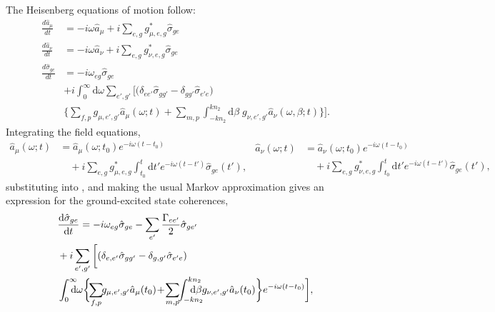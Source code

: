 \documentclass[aps,pra,twocolumn]{revtex4-1} %
\newcommand{\der}[1]{\frac{d {#1}}{dt}}
\begin{document}
The Heisenberg equations of motion follow:
	\begin{align}
		\der{\hat{a}_\mu} &= -i\omega \hat{a}_\mu +i\sum_{e,g} g_{\mu, e,g}^* \hat{\sigma}_{ge} \label{eq:da}\\
		\der{\hat{a}_\nu} &= -i\omega \hat{a}_\nu +i\sum_{e,g} g_{\nu, e,g}^*  \hat{\sigma}_{ge}\label{eq:danu}\\
		\der{\hat{\sigma}_{ge}} &= -i\omega_{eg} \hat{\sigma}_{ge} \label{Eq::dsigma}  \\
			&+ i\!\int_0^{\infty}\!\!\!\!\! \mathrm{d}\omega \sum_{e',g'} \bigg[ \big(\delta_{ee'} \hat{\sigma}_{gg'} \!-\! \delta_{gg'} \hat{\sigma}_{e'e} \big) \nonumber\\
		&\!\!\!\!\! \bigg\{ \sum_{f,p}  g_{\mu, e',g'}\hat{a}_\mu (\omega; t) \!+\! \sum_{m,p} \!\int_{-kn_2}^{kn_2}\!\!\!\!\!\! \mathrm{d}\beta \; g_{\nu, e',g'} \hat{a}_\nu(\omega, \beta; t) \bigg\} \bigg]. \nonumber
	\end{align}
Integrating the field equations, 
\begin{subequations}\label{eq:aout1}
\begin{align}
\hat{a}_\mu(\omega; t) &= \hat{a}_\mu(\omega; t_0) e^{-i\omega (t-t_0)} \nonumber\\
&\quad +i \sum_{e,g} g_{\mu,e,g}^* \int_{t_0}^t 
\mathrm{d} t' e^{-i\omega (t-t')}\hat{\sigma}_{ge}(t'), \label{Eq::aguidedEOM}
\end{align}
\begin{align}
\hat{a}_\nu (\omega; t) &= \hat{a}_\nu (\omega; t_0) e^{-i\omega (t-t_0)} \nonumber\\
&\quad +i \sum_{e,g} g_{\nu,e,g}^* \int_{t_0}^t \mathrm{d} 
t' e^{-i\omega (t-t')}\hat{\sigma}_{ge}(t'),
\end{align}
\end{subequations}
substituting into , and making the usual Markov approximation gives an expression for the ground-excited state coherences,
\begin{align}
&\dt{\hat{\sigma}_{ge}} =-i\omega_{eg} 
\hat{\sigma}_{ge}-\sum_{e'}\frac{\Gamma_{ee'}}{2}\hat{\sigma}_{ge'}  \\
&+i \sum_{e',g'}\bigg[ (\delta_{e,e'} \hat{\sigma}_{gg'} - \delta_{g,g'} 
\hat{\sigma}_{e'e})\nn\\
&\int_0^{\infty}\!\!\!\!\!\mathrm{d}\omega \bigg\{\!\!\sum_{f,p} \!\! g_{\mu, e',g'} \hat{a}_\mu (t_0) 
\!+\! \sum_{m,p}\!\!  \int_{-kn_2}^{kn_2}\!\!\!\!\!\!\!\!\!\mathrm{d}\beta  g_{\nu, e',g'} \hat{a}_\nu(t_0) \bigg\} e^{-i\omega 
(t-t_0)}\bigg], \nonumber
\end{align}
\end{document}
